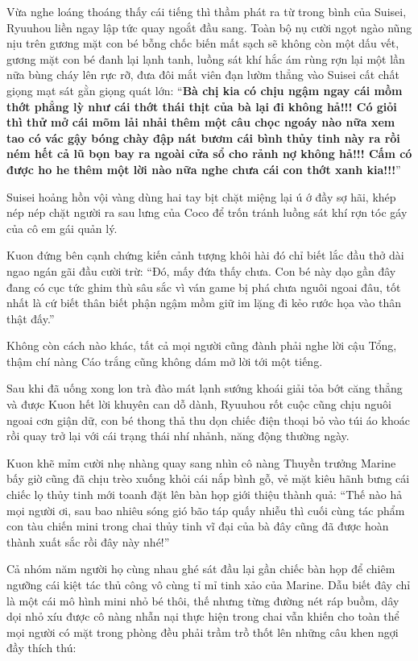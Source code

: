 \documentclass[../main.tex]{subfiles}
\begin{document}
Vừa nghe loáng thoáng thấy cái tiếng thì thầm phát ra từ trong bình của Suisei, Ryuuhou liền ngay lập tức quay ngoắt đầu sang. Toàn bộ nụ cười ngọt ngào nũng nịu trên gương mặt con bé bỗng chốc biến mất sạch sẽ không còn một dấu vết, gương mặt con bé đanh lại lạnh tanh, luồng sát khí hắc ám rùng rợn lại một lần nữa bùng cháy lên rực rỡ, đưa đôi mắt viên đạn lườm thẳng vào Suisei cất chất giọng mạt sát gằn giọng quát lớn: ``\textbf{Bà chị kia có chịu ngậm ngay cái mồm thớt phẳng lỳ như cái thớt thái thịt của bà lại đi không hả!!! Có giỏi thì thử mở cái mõm lải nhải thêm một câu chọc ngoáy nào nữa xem tao có vác gậy bóng chày đập nát bươm cái bình thủy tinh này ra rồi ném hết cả lũ bọn bay ra ngoài cửa sổ cho rảnh nợ không hả!!! Cấm có được ho he thêm một lời nào nữa nghe chưa cái con thớt xanh kia!!!}''

Suisei hoảng hồn vội vàng dùng hai tay bịt chặt miệng lại ú ớ đầy sợ hãi, khép nép nép chặt người ra sau lưng của Coco để trốn tránh luồng sát khí rợn tóc gáy của cô em gái quản lý.

Kuon đứng bên cạnh chứng kiến cảnh tượng khôi hài đó chỉ biết lắc đầu thở dài ngao ngán gãi đầu cười trừ: ``Đó, mấy đứa thấy chưa. Con bé này dạo gần đây đang có cục tức ghim thù sâu sắc vì ván game bị phá chưa nguôi ngoai đâu, tốt nhất là cứ biết thân biết phận ngậm mồm giữ im lặng đi kẻo rước họa vào thân thật đấy.''

Không còn cách nào khác, tất cả mọi người cũng đành phải nghe lời cậu Tổng, thậm chí nàng Cáo trắng cũng không dám mở lời tới một tiếng.

\ct

Sau khi đã uống xong lon trà đào mát lạnh sướng khoái giải tỏa bớt căng thẳng và được Kuon hết lời khuyên can dỗ dành, Ryuuhou rốt cuộc cũng chịu nguôi ngoai cơn giận dữ, con bé thong thả thu dọn chiếc điện thoại bỏ vào túi áo khoác rồi quay trở lại với cái trạng thái nhí nhảnh, năng động thường ngày.

Kuon khẽ mỉm cười nhẹ nhàng quay sang nhìn cô nàng Thuyền trưởng Marine bấy giờ cũng đã chịu trèo xuống khỏi cái nắp bình gỗ, vẻ mặt kiêu hãnh bưng cái chiếc lọ thủy tinh mới toanh đặt lên bàn họp giới thiệu thành quả: ``Thế nào hả mọi người ơi, sau bao nhiêu sóng gió bão táp quấy nhiễu thì cuối cùng tác phẩm con tàu chiến mini trong chai thủy tinh vĩ đại của bà đây cũng đã được hoàn thành xuất sắc rồi đây này nhé!''


Cả nhóm năm người họ cùng nhau ghé sát đầu lại gần chiếc bàn họp để chiêm ngưỡng cái kiệt tác thủ công vô cùng tỉ mỉ tinh xảo của Marine. Dẫu biết đây chỉ là một cái mô hình mini nhỏ bé thôi, thế nhưng từng đường nét ráp buồm, dây dọi nhỏ xíu được cô nàng nhẫn nại thực hiện trong chai vẫn khiến cho toàn thể mọi người có mặt trong phòng đều phải trầm trồ thốt lên những câu khen ngợi đầy thích thú:
\end{document}
